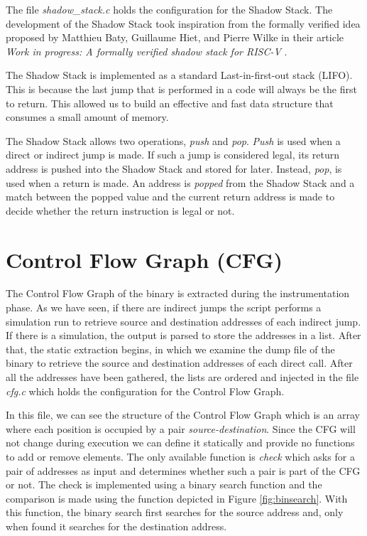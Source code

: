 The file \textit{shadow\_stack.c} holds the configuration for the Shadow Stack.
The development of the Shadow Stack took inspiration from the formally verified
idea proposed by Matthieu Baty, Guillaume Hiet, and Pierre Wilke in their
article \textit{Work in progress: A formally verified shadow stack for RISC-V} \cite{shadowstack}.

The Shadow Stack is implemented as a standard Last-in-first-out stack (LIFO).
This is because the last jump that is performed in a code will always be the
first to return. This allowed us to build an effective and fast data structure that
consumes a small amount of memory.

The Shadow Stack allows two operations, \textit{push} and \textit{pop}. \textit{Push}
is used when a direct or indirect jump is made. If such a jump is considered legal,
its return address is pushed into the Shadow Stack and stored for later. Instead,
\textit{pop}, is used when a return is made. An address is \textit{popped} from
the Shadow Stack and a match between the popped value and the current return
address is made to decide whether the return instruction is legal or not.

\section{Control Flow Graph (CFG)}
\label{sec:project_cfg}

The Control Flow Graph of the binary is extracted during the instrumentation phase.
As we have seen, if there are indirect jumps the script performs a simulation run
to retrieve source and destination addresses of each indirect jump. If there is
a simulation, the output is parsed to store the addresses in a list. After that,
the static extraction begins, in which we examine the dump file of the binary to
retrieve the source and destination addresses of each direct call. After all the
addresses have been gathered, the lists are ordered and injected in the file
\textit{cfg.c} which holds the configuration for the Control Flow Graph.

In this file, we can see the structure of the Control Flow Graph which is an
array where each position is occupied by a pair \textit{source-destination}.
Since the CFG will not change during execution we can define it statically and
provide no functions to add or remove elements. The only available function is \textit{check}
which asks for a pair of addresses as input and determines whether such a pair
is part of the CFG or not. The check is implemented using a binary search function
and the comparison is made using the function depicted in Figure \ref{fig:binsearch}.
With this function, the binary search first searches for the source address and,
only when found it searches for the destination address.

